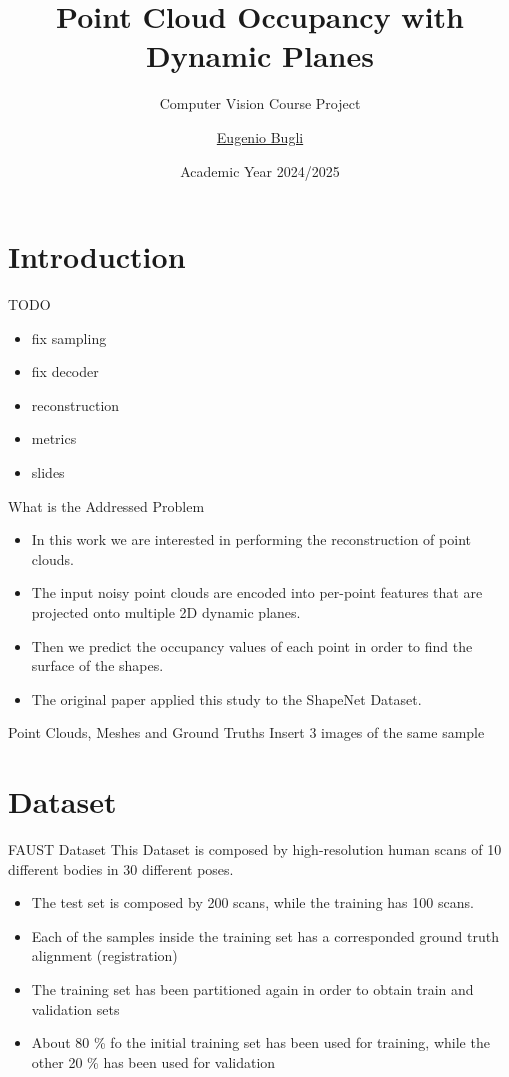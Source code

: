 \documentclass{beamer}
\title{Point Cloud Occupancy with Dynamic Planes}
\subtitle{Computer Vision Course Project}
\author{\href{mailto:bugli.1934824@studenti.uniroma1.it}{Eugenio Bugli}}
\date{Academic Year 2024/2025}
\begin{document}
\maketitle

\section{Introduction}

\begin{frame}{TODO}
\begin{itemize}
\item fix sampling
\item fix decoder
\item reconstruction
\item metrics
\item slides
\end{itemize}
\end{frame}

\begin{frame}{What is the Addressed Problem}
\begin{itemize}
	\item In this work we are interested in performing the reconstruction of point clouds. 
	\item The input noisy point clouds are encoded into per-point features that are projected onto multiple 2D dynamic planes.
	\item Then we predict the occupancy values of each point in order to find the surface of the shapes.
	\item The original paper applied this study to the ShapeNet Dataset.
\end{itemize}
\end{frame} 

\begin{frame}{Point Clouds, Meshes and Ground Truths}
Insert 3 images of the same sample
\end{frame}

\section{Dataset}

\begin{frame}{FAUST Dataset}
    This Dataset is composed by high-resolution human scans of 10 different bodies in 30 different poses. 
    \begin{itemize}
    \item The test set is composed by 200 scans, while the training has 100 scans.
    \item Each of the samples inside the training set has a corresponded ground truth alignment (registration)
    \item The training set has been partitioned again in order to obtain train and validation sets
    \item About 80 \% fo the initial training set has been used for training, while the other 20 \% has been used for validation 
    \end{itemize}
\end{frame}
\end{document}
